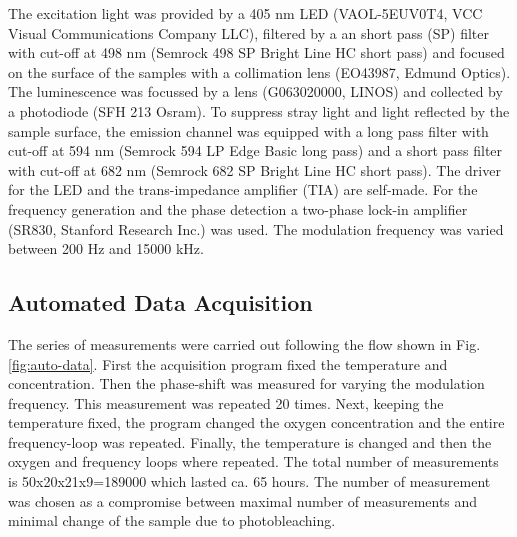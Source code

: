 \documentclass[9pt,twocolumn,twoside,pdftex]{optica}
\begin{document}
The excitation light was provided by a 405 nm LED (VAOL-5EUV0T4, VCC Visual Communications Company LLC), filtered by a an short pass (SP) filter with cut-off at 498 nm (Semrock 498 SP Bright Line HC short pass) and focused on the surface of the samples with a collimation lens (EO43987, Edmund Optics). The luminescence was focussed by a lens (G063020000, LINOS) and collected by a photodiode (SFH 213 Osram).
To suppress stray light and light reflected by the sample surface, the emission channel was equipped with a long pass filter with cut-off at 594 nm (Semrock 594 LP Edge Basic long pass) and a short pass filter with cut-off at 682 nm (Semrock 682 SP Bright Line HC short pass). The driver for the LED and the trans-impedance amplifier (TIA) are self-made.
For the frequency generation and the phase detection a two-phase lock-in amplifier (SR830, Stanford Research Inc.) was used. The modulation frequency was varied between 200 Hz and 15000 kHz.

\subsection{Automated Data Acquisition}
\label{Data}

The series of measurements were carried out following the flow shown in Fig. \ref{fig:auto-data}. First the acquisition program fixed the temperature and concentration. Then the phase-shift was measured for varying the modulation frequency. This measurement was repeated 20 times. Next, keeping the temperature fixed, the program changed the oxygen concentration and the entire frequency-loop was repeated. Finally, the temperature is changed and then the oxygen and frequency loops where repeated.
The total number of measurements is 50x20x21x9=189000 which lasted ca. 65 hours. The number of measurement was chosen as a compromise between maximal number of measurements and minimal change of the sample due to photobleaching. 
\end{document}
